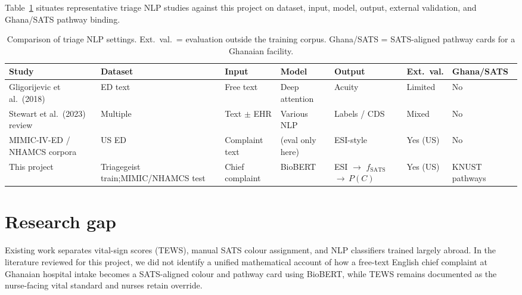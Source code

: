 Table~\ref{tab:triage-nlp-compare} situates representative triage NLP studies against this project on dataset, input, model, output, external validation, and Ghana/SATS pathway binding.

\begin{table}[H]
\centering
\footnotesize
\begin{tabularx}{\textwidth}{%
  |>{\raggedright\arraybackslash}p{2.05cm}%
  |>{\raggedright\arraybackslash}X%
  |>{\raggedright\arraybackslash}p{1.45cm}%
  |>{\raggedright\arraybackslash}p{1.55cm}%
  |>{\raggedright\arraybackslash}X%
  |>{\centering\arraybackslash}p{1.15cm}%
  |>{\raggedright\arraybackslash}p{1.35cm}|}
\hline
\textbf{Study} & \textbf{Dataset} & \textbf{Input} & \textbf{Model} & \textbf{Output} & \textbf{Ext.\ val.} & \textbf{Ghana/SATS} \\
\hline
Gligorijevic et al.\ (2018) & ED text & Free text & Deep attention & Acuity & Limited & No \\
Stewart et al.\ (2023) review & Multiple & Text \(\pm\) EHR & Various NLP & Labels / CDS & Mixed & No \\
MIMIC-IV-ED / NHAMCS corpora & US ED & Complaint text & (eval only here) & ESI-style & Yes (US) & No \\
This project &
  Triagegeist train;\newline MIMIC/\newline NHAMCS test &
  Chief complaint &
  BioBERT &
  ESI \(\to\) \(f_{\mathrm{SATS}}\)\newline \(\to\,P(C)\) &
  Yes (US) &
  KNUST pathways \\
\hline
\end{tabularx}
\caption{Comparison of triage NLP settings. Ext.\ val.\ = evaluation outside the training corpus. Ghana/SATS = SATS-aligned pathway cards for a Ghanaian facility.}
\label{tab:triage-nlp-compare}
\end{table}

\section{Research gap}

Existing work separates vital-sign scores (TEWS), manual SATS colour assignment, and NLP classifiers trained largely abroad. In the literature reviewed for this project, we did not identify a unified mathematical account of how a free-text English chief complaint at Ghanaian hospital intake becomes a SATS-aligned colour and pathway card using BioBERT, while TEWS remains documented as the nurse-facing vital standard and nurses retain override.

